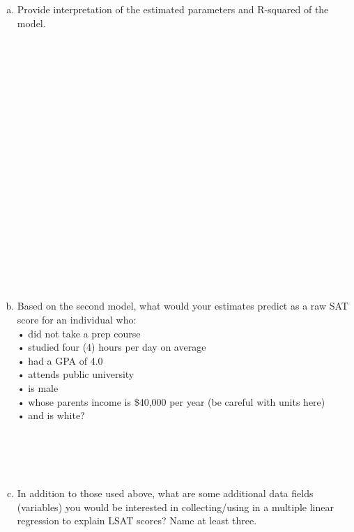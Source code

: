 \documentclass[12pt]{article}
\begin{document}
\begin{enumerate}[(1)]
\begin{enumerate}[(a)]
\item Provide interpretation of the estimated parameters and R-squared of the model.\\
\\
\\
\\
\\
\\
\\
\\
\\
\\
\\
\\
\\
\\
\\
\\
\\
\\
\\
\\
\item Based on the second model, what would your estimates predict as a raw SAT score for an individual who: \\
•	did not take a prep course\\
•	studied four (4) hours per day on average\\
•	had a GPA of 4.0\\
•	attends public university\\
•	is male\\
•	whose parents income is \$40,000 per year (be careful with units here)\\
•	and is white?\\
\\
\\
\\
\pagebreak\\
\item In addition to those used above, what are some additional data fields (variables) you would be interested in collecting/using in a multiple linear regression to explain LSAT scores? Name at least three.\\
\\
\\
\\
\\
\\
\\
\\
\\
\end{enumerate}


\end{enumerate}
\end{document}

